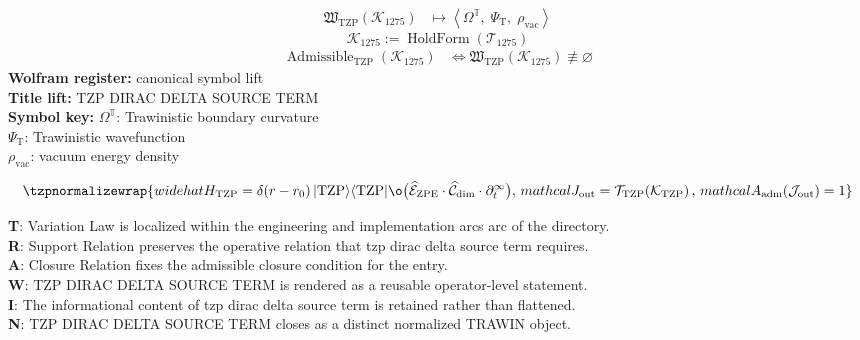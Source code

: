 \noindent
\begin{minipage}[t]{0.48\linewidth}
\begingroup
\small
\[
\begin{aligned}
\mathfrak{W}_{\mathrm{TZP}}\!\left(\mathcal{K}_{1275}\right)
&\longmapsto
\left\langle \Omega^{\mathbb{T}},\; \Psi_{\mathrm{T}},\; \rho_{\mathrm{vac}} \right\rangle
\end{aligned}
\]
\[
\mathcal{K}_{1275}
:=
\operatorname{HoldForm}\!\left(\mathcal{T}_{1275}\right)
\]
\[
\begin{aligned}
\operatorname{Admissible}_{\mathrm{TZP}}\!\left(\mathcal{K}_{1275}\right)
&\Longleftrightarrow
\mathfrak{W}_{\mathrm{TZP}}\!\left(\mathcal{K}_{1275}\right)\not\equiv\varnothing
\end{aligned}
\]
\textbf{Wolfram register:} canonical symbol lift\\
\textbf{Title lift:} TZP DIRAC DELTA SOURCE TERM\\
\textbf{Symbol key:} \(\Omega^{\mathbb{T}}\): Trawinistic boundary curvature\\ \(\Psi_{\mathrm{T}}\): Trawinistic wavefunction\\ \(\rho_{\mathrm{vac}}\): vacuum energy density
\par
\endgroup
\end{minipage}\hfill
\begin{minipage}[t]{0.48\linewidth}
\[
\tzpnormalizewrap{widehat{H}_{\mathrm{TZP}} = \delta(r - r_{0})\, \lvert \mathrm{TZP} \rangle \langle \mathrm{TZP} \rvert \o\bigl( \widehat{\mathcal{E}}_{\mathrm{ZPE}} \cdot \widehat{\mathcal{C}}_{\mathrm{dim}} \cdot \partial_{t}^{\infty} \bigr),\,mathcal{J}_{\mathrm{out}} = \mathcal{T}_{\mathrm{TZP}}\!\left(\mathcal{K}_{\mathrm{TZP}}\right),\,mathcal{A}_{\mathrm{adm}}\!\left(\mathcal{J}_{\mathrm{out}}\right)=1}
\]

\small
\textbf{T}: Variation Law is localized within the engineering and implementation arcs arc of the directory.\\
\textbf{R}: Support Relation preserves the operative relation that tzp dirac delta source term requires.\\
\textbf{A}: Closure Relation fixes the admissible closure condition for the entry.\\
\textbf{W}: TZP DIRAC DELTA SOURCE TERM is rendered as a reusable operator-level statement.\\
\textbf{I}: The informational content of tzp dirac delta source term is retained rather than flattened.\\
\textbf{N}: TZP DIRAC DELTA SOURCE TERM closes as a distinct normalized TRAWIN object.
\normalsize
\end{minipage}

